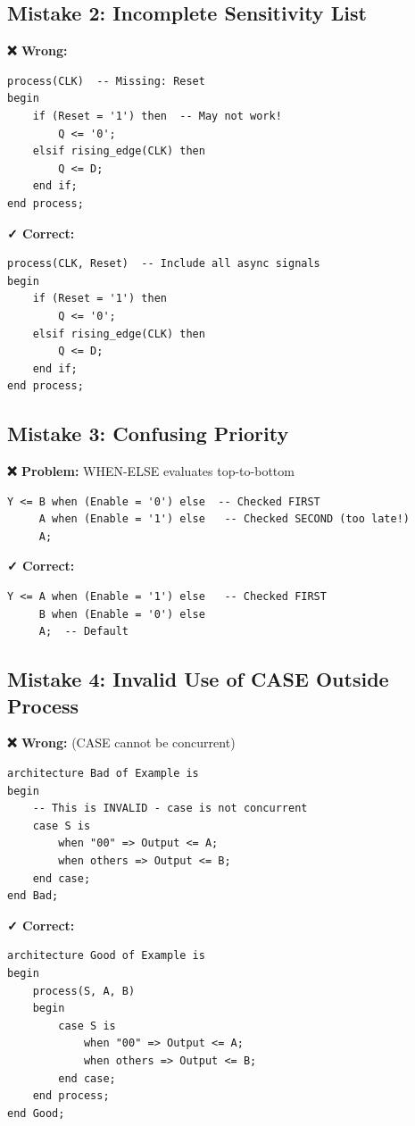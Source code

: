 \documentclass[12pt,a4paper]{article}
\begin{document}
\subsection{Mistake 2: Incomplete Sensitivity List}

\textbf{❌ Wrong:}
\begin{lstlisting}
process(CLK)  -- Missing: Reset
begin
    if (Reset = '1') then  -- May not work!
        Q <= '0';
    elsif rising_edge(CLK) then
        Q <= D;
    end if;
end process;
\end{lstlisting}

\textbf{✓ Correct:}
\begin{lstlisting}
process(CLK, Reset)  -- Include all async signals
begin
    if (Reset = '1') then
        Q <= '0';
    elsif rising_edge(CLK) then
        Q <= D;
    end if;
end process;
\end{lstlisting}

\subsection{Mistake 3: Confusing Priority}

\textbf{❌ Problem:} WHEN-ELSE evaluates top-to-bottom
\begin{lstlisting}
Y <= B when (Enable = '0') else  -- Checked FIRST
     A when (Enable = '1') else   -- Checked SECOND (too late!)
     A;
\end{lstlisting}

\textbf{✓ Correct:}
\begin{lstlisting}
Y <= A when (Enable = '1') else   -- Checked FIRST
     B when (Enable = '0') else
     A;  -- Default
\end{lstlisting}

\subsection{Mistake 4: Invalid Use of CASE Outside Process}

\textbf{❌ Wrong:} (CASE cannot be concurrent)
\begin{lstlisting}
architecture Bad of Example is
begin
    -- This is INVALID - case is not concurrent
    case S is
        when "00" => Output <= A;
        when others => Output <= B;
    end case;
end Bad;
\end{lstlisting}

\textbf{✓ Correct:}
\begin{lstlisting}
architecture Good of Example is
begin
    process(S, A, B)
    begin
        case S is
            when "00" => Output <= A;
            when others => Output <= B;
        end case;
    end process;
end Good;
\end{lstlisting}
\end{document}
